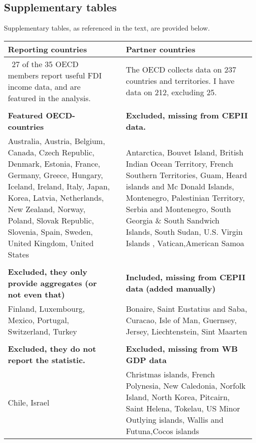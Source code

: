 \documentclass[twoside,a4paper,11pt]{article}
\begin{document}
\subsection{Supplementary tables}\label{AppTables}
Supplementary tables, as referenced in the text, are provided below. 
\newpage
\noindent\begin{minipage}{\linewidth}
	\label{coveredcountries}
	\begin{tabular}{L{7cm}L{1cm}L{7cm}}
		\textbf{Reporting countries} & \qquad  & \textbf{Partner countries} \\ \hline \
		\footnotesize 27 of the 35 OECD members report useful FDI income data, and are featured in the analysis.&& 
		\footnotesize The OECD collects data on 237 countries and territories. I have data on 212, excluding 25.  \\
		&&\\
		\footnotesize \textbf{Featured OECD-countries} &&
		\footnotesize \textbf{Excluded, missing from CEPII data.} \\
		\footnotesize Australia,  Austria, Belgium, Canada, Czech Republic, Denmark, Estonia, France, Germany, Greece, Hungary, Iceland, Ireland, Italy, Japan, Korea, Latvia, Netherlands, New Zealand, Norway, Poland, Slovak Republic, Slovenia, Spain, Sweden, United Kingdom, United States
		&&
		\footnotesize Antarctica, Bouvet Island, British Indian Ocean Territory, French Southern Territories, Guam, Heard islands and Mc Donald Islands, Montenegro, Palestinian Territory, Serbia and Montenegro, South Georgia \& South Sandwich Islands, South Sudan, U.S. Virgin Islands , Vatican,American Samoa
		\\
		&&\\
		\footnotesize \textbf{Excluded, they only provide aggregates (or not even that)}
		&&\footnotesize \textbf{Included, missing from CEPII data} \newline \textbf{(added manually) }
		\\
		\footnotesize Finland, Luxembourg, Mexico, Portugal, Switzerland, Turkey && 	
		\footnotesize Bonaire, Saint Eustatius and Saba, Curacao, Isle of Man, Guernsey, Jersey, Liechtenstein, Sint Maarten
		\\
		&&\\
		\footnotesize \textbf{Excluded, they do not report the statistic.}&&
		\footnotesize \textbf{Excluded, missing from WB GDP data }\\
		\footnotesize Chile, Israel && 
		\footnotesize Christmas islands, French Polynesia, New Caledonia, Norfolk Island, North Korea, Pitcairn, Saint Helena, Tokelau, US Minor Outlying islands, Wallis and Futuna,Cocos islands

\end{tabular}
\end{minipage}
\end{document}
